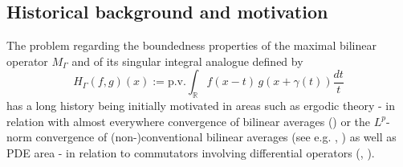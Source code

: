 \documentclass{amsart}
\newcommand{\R}{\mathbb{R}}
\def\G{\Gamma}
\newcommand{\g}{\gamma}
\def\beq{\begin{equation}}
\def\eeq{\end{equation}}
\theoremstyle{definition}
\theoremstyle{remark}
\numberwithin{equation}{section}
\begin{document}
\subsection{Historical background and motivation}

The problem regarding the boundedness properties of the maximal bilinear operator $M_{\G}$ and of its singular integral analogue defined by
\beq\label{nhilb}
H_{\Gamma}(f,g)(x):= \textrm{p.v.}\int_{\R} f(x-t)\,g(x+\g(t))\frac{dt}{t}
\eeq
has a long history being initially motivated in areas such as ergodic theory - in relation with almost everywhere convergence of bilinear averages (\cite{Bou}) or the $L^p$-norm convergence of (non-)conventional bilinear averages (see e.g. \cite{Fu}, \cite{HKr}) as well as PDE area - in relation to commutators involving differential operators (\cite{Cal1}, \cite{calderon1978commutators}).
\end{document}

